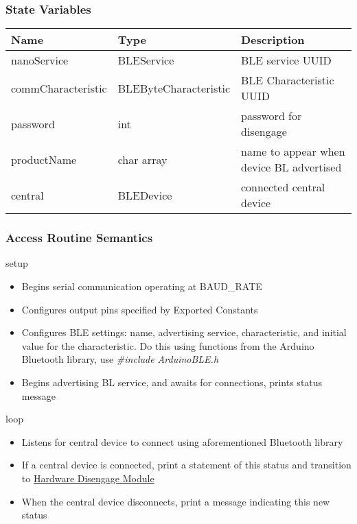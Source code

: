 \documentclass[12pt, titlepage]{article}
\begin{document}
\subsubsection{State Variables}

\begin{center}
\begin{tabular}{p{4cm} p{4cm} p{6cm}}
\hline
\textbf{Name} & \textbf{Type} & \textbf{Description} \\
\hline
nanoService & BLEService & BLE service UUID\\
commCharacteristic & BLEByteCharacteristic & BLE Characteristic UUID\\
password & int & password for disengage \\
productName & char array & name to appear when device BL advertised \\
central & BLEDevice & connected central device \\
\hline
\end{tabular}
\end{center}

\subsubsection{Access Routine Semantics}

\noindent setup
\begin{itemize}
\item Begins serial communication operating at BAUD\_RATE
\item Configures output pins specified by Exported Constants
\item Configures BLE settings: name, advertising service, characteristic, and initial value for the characteristic. Do this using functions from the Arduino Bluetooth library, use  \textit{\#include ArduinoBLE.h}
\item Begins advertising BL service, and awaits for connections, prints status message

\end{itemize}

\noindent loop
\begin{itemize}
\item Listens for central device to connect using aforementioned Bluetooth library
\item If a central device is connected, print a statement of this status and transition to \hyperref[mHD]{Hardware Disengage Module}
\item When the central device disconnects, print a message indicating this new status
\end{itemize}
\end{document}
